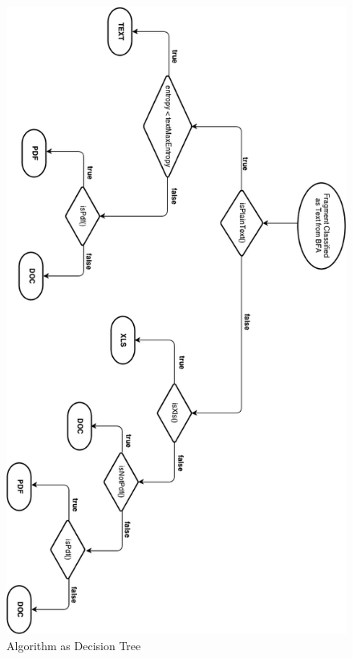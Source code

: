 \begin{figure}
\centering
 \includegraphics[scale=0.65]{./Figures/flowchart}
   \caption{Algorithm as Decision Tree\label{flowchart}}
\end{figure}